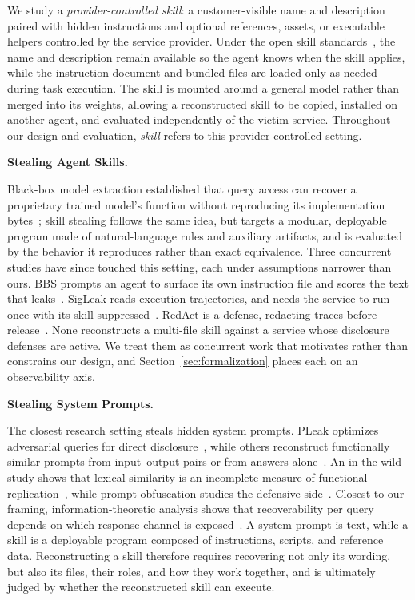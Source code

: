 \documentclass[letterpaper,twocolumn,10pt]{article}
\newcommand{\paragraphtitle}[1]{%
  \vspace{5pt}\noindent\textbf{#1.}%
}
\begin{document}
We study a \emph{provider-controlled skill}: a customer-visible name and description paired with hidden instructions and optional references, assets, or executable helpers controlled by the service provider. 
Under the open skill standards~\cite{agentskills, openaiskills}, the name and description remain available so the agent knows when the skill applies, while the instruction document and bundled files are loaded only as needed during task execution. The skill is mounted around a general model rather than merged into its weights, allowing a reconstructed skill to be copied, installed on another agent, and evaluated independently of the victim service. 
Throughout our design and evaluation, \emph{skill} refers to this provider-controlled setting.


\paragraphtitle{Stealing Agent Skills}
Black-box model extraction established that query access can recover a proprietary trained model’s function without reproducing its implementation bytes~\cite{tramer2016stealing}; skill stealing follows the same idea, but targets a modular, deployable program made of natural-language rules and auxiliary artifacts, and is evaluated by the behavior it reproduces rather than exact equivalence.
Three concurrent studies have since touched this setting, each under
assumptions narrower than ours.  BBS prompts an agent to surface its own
instruction file and scores the text that leaks~\cite{wang2026blackboxskill}.
SigLeak reads execution trajectories, and needs the service to run once with its
skill suppressed~\cite{geng2026agentskills}.  RedAct is a defense, redacting
traces before release~\cite{xu2026redact}.  None
reconstructs a multi-file skill against a service whose disclosure defenses
are active.  We treat them as concurrent work that motivates rather than
constrains our design, and
Section~\ref{sec:formalization} places each on an observability axis.

\paragraphtitle{Stealing System Prompts}
The closest research setting steals hidden system prompts. 
PLeak optimizes adversarial queries for direct disclosure~\cite{hui2024pleak}, while others reconstruct functionally similar prompts from input–output pairs or from answers alone~\cite{yang2025prsa,sha2024promptstealing}. 
An in-the-wild study shows that lexical similarity is an incomplete measure of functional replication~\cite{tan2025effectiveness}, while prompt obfuscation studies the defensive side~\cite{pape2025obfuscation}. 
Closest to our framing, information-theoretic analysis shows that recoverability per query depends on which response channel is exposed~\cite{kaneko2025bits}. A system prompt is text, while a skill is a deployable program composed of instructions, scripts, and reference data. Reconstructing a skill therefore requires recovering not only its wording, but also its files, their roles, and how they work together, and is ultimately judged by whether the reconstructed skill can execute.
\end{document}
